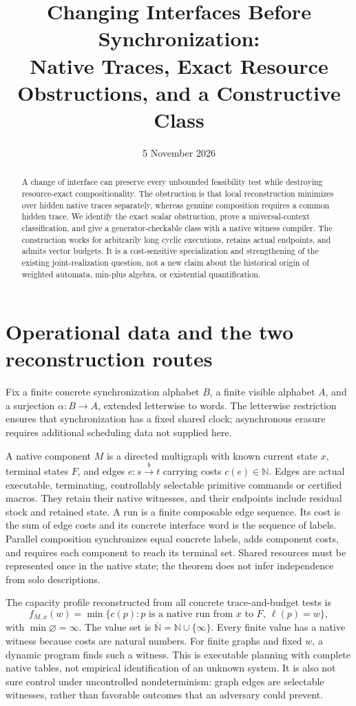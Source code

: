 \documentclass[11pt]{article}
\title{Changing Interfaces Before Synchronization:\\Native Traces, Exact Resource Obstructions, and a Constructive Class}
\author{}\date{5 November 2026}
\newcommand{\NN}{\mathbb N}
\newcommand{\Cost}{\overline{\mathbb N}}
\begin{document}
\maketitle
\begin{abstract}
A change of interface can preserve every unbounded feasibility test while destroying resource-exact compositionality. The obstruction is that local reconstruction minimizes over hidden native traces separately, whereas genuine composition requires a common hidden trace. We identify the exact scalar obstruction, prove a universal-context classification, and give a generator-checkable class with a native witness compiler. The construction works for arbitrarily long cyclic executions, retains actual endpoints, and admits vector budgets. It is a cost-sensitive specialization and strengthening of the existing joint-realization question, not a new claim about the historical origin of weighted automata, min-plus algebra, or existential quantification.
\end{abstract}

\section{Operational data and the two reconstruction routes}
Fix a finite concrete synchronization alphabet $B$, a finite visible alphabet $A$, and a surjection $\alpha:B\to A$, extended letterwise to words. The letterwise restriction ensures that synchronization has a fixed shared clock; asynchronous erasure requires additional scheduling data not supplied here.

A native component $M$ is a directed multigraph with known current state $x$, terminal states $F$, and edges $e:s\xrightarrow{b}t$ carrying costs $c(e)\in\NN$. Edges are actual executable, terminating, controllably selectable primitive commands or certified macros. They retain their native witnesses, and their endpoints include residual stock and retained state. A run is a finite composable edge sequence. Its cost is the sum of edge costs and its concrete interface word is the sequence of labels. Parallel composition synchronizes equal concrete labels, adds component costs, and requires each component to reach its terminal set. Shared resources must be represented once in the native state; the theorem does not infer independence from solo descriptions.

The capacity profile reconstructed from all concrete trace-and-budget tests is
\[
 f_{M,x}(w)=\min\{c(p):p\text{ is a native run from }x\text{ to }F,\ \ell(p)=w\},
\]
with $\min\varnothing=\infty$. The value set is $\Cost=\NN\cup\{\infty\}$. Every finite value has a native witness because costs are natural numbers. For finite graphs and fixed $w$, a dynamic program finds such a witness. This is executable planning with complete native tables, not empirical identification of an unknown system. It is also not sure control under uncontrolled nondeterminism: graph edges are selectable witnesses, rather than favorable outcomes that an adversary could prevent.
\end{document}
